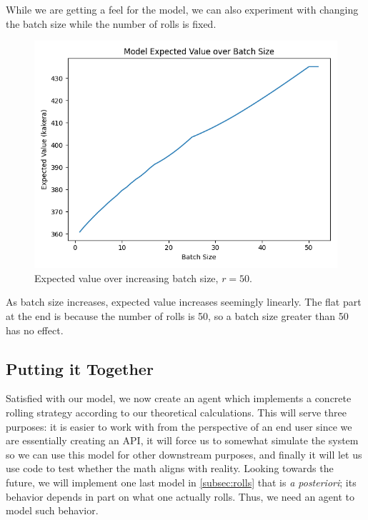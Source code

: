 \documentclass[11pt, oneside]{article}
\theoremstyle{plain}
\theoremstyle{definition}
\begin{document}
While we are getting a feel for the model, we can also experiment
with changing the batch size while the number of rolls is fixed.
\begin{figure}[h!]
  \centering
  \includegraphics[scale=0.6]{graphs/expected_value/batch_size.png}
  \caption{Expected value over increasing batch size, \( r = 50 \).}
\end{figure}

As batch size increases, expected value increases seemingly
linearly. The flat part at the end is because the number of
rolls is 50, so a batch size greater than 50 has no effect.

\subsection{Putting it Together}
Satisfied with our model, we now create an agent which implements a concrete
rolling strategy according to our theoretical calculations. This will serve
three purposes: it is easier to work with from the perspective of an end user
since we are essentially creating an API, it will force us to somewhat simulate
the system so we can use this model for other downstream purposes, and finally
it will let us use code to test whether the math aligns with reality. Looking
towards the future, we will implement one last model in \autoref{subsec:rolls}
that is \textit{a posteriori}; its behavior depends in part on what one
actually rolls. Thus, we need an agent to model such behavior.
\end{document}
